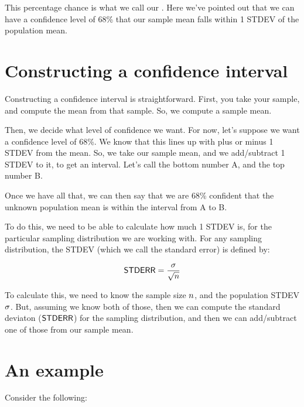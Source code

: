 \documentclass[../../../main.tex]{subfiles}
\begin{document}
This percentage chance is what we call our . Here we've pointed out that we can have a confidence level of 68\% that our sample mean falls within 1 STDEV of the population mean. 


\section{Constructing a confidence interval}

Constructing a confidence interval is straightforward. First, you take your sample, and compute the mean from that sample. So, we compute a sample mean.

Then, we decide what level of confidence we want. For now, let's suppose we want a confidence level of 68\%. We know that this lines up with plus or minus 1 STDEV from the mean. So, we take our sample mean, and we add/subtract 1 STDEV to it, to get an interval. Let's call the bottom number A, and the top number B.

Once we have all that, we can then say that we are 68\% confident that the unknown population mean is within the interval from A to B.

To do this, we need to be able to calculate how much 1 STDEV is, for the particular sampling distribution we are working with. For any sampling distribution, the STDEV (which we call the standard error) is defined by:

\begin{equation*}
  \StdErr/ = \frac{\populationstdev}{\sqrt{\samplesize/}}
\end{equation*}

\noindent
To calculate this, we need to know the sample size $\samplesize/$, and the population STDEV $\sigma$. But, assuming we know both of those, then we can compute the standard deviaton ($\StdErr/$) for the sampling distribution, and then we can add/subtract one of those from our sample mean.


\section{An example}

Consider the following:
\end{document}
